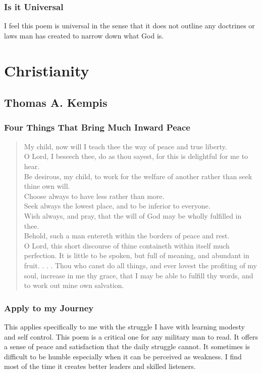 \documentclass[11pt,a4paper]{scrartcl} %
\begin{document}
\subsubsection{Is it Universal}
I feel this poem is universal in the sense that it does not outline any doctrines or laws man has created to narrow down what God is.
\section{Christianity}
\subsection{Thomas A. Kempis}
\subsubsection{Four Things That Bring Much Inward Peace}
\begin{verse}
My child, now will I teach thee the way of peace and true liberty.\\
O Lord, I beseech thee, do as thou sayest, for this is delightful for me to hear.\\
Be desirous, my child, to work for the welfare of another rather than seek thine own will.\\
Choose always to have less rather than more.\\
Seek always the lowest place, and to be inferior to everyone.\\
Wish always, and pray, that the will of God may be wholly fulfilled in thee.\\
Behold, such a man entereth within the borders of peace and rest.\\
O Lord, this short discourse of thine containeth within itself much perfection. It is little to be spoken, but full of meaning, and abundant in fruit. . . . Thou who canst do all things, and ever lovest the profiting of my soul, increase in me thy grace, that I may be able to fulfill thy words, and to work out mine own salvation.
\end{verse}
\textcolor{brown}{\citealp[pg. 199]{eknath}}

\subsubsection{Apply to my Journey}
This applies specifically to me with the struggle I have with learning modesty and self control. This poem is a critical one for any military man to read. It offers a sense of peace and satisfaction that the daily struggle cannot. It sometimes is difficult to be humble especially when it can be perceived as weakness. I find most of the time it creates better leaders and skilled listeners. 
\end{document}
